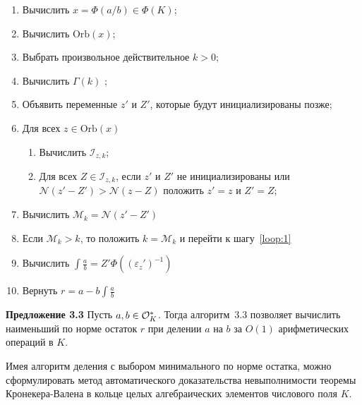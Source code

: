 \documentclass[_00_autoref.tex]{subfiles}
\begin{document}
    \begin{enumerate}
        \item Вычислить $x = \Phi(a/b) \in \Phi(K)$;
        
        \item Вычислить $\textrm{Orb}(x)$;

        \item Выбрать произвольное действительное $k > 0$;

        \item Вычислить $\Gamma(k)$ \label{loop:1};

        \item Объявить переменные $z'$ и $Z'$, которые будут инициализированы позже;

        \item Для всех $z \in \textrm{Orb}(x)$
        \begin{enumerate}
            \item Вычислить $\mathcal{I}_{z, k}$;

            \item Для всех $Z \in \mathcal{I}_{z, k}$, если $z'$ и $Z'$ не инициализированы или $\mathcal{N}(z' - Z') > \mathcal{N}(z - Z)$ положить $z' = z$ и $Z' = Z$;
        \end{enumerate}

        \item Вычислить $\mathcal{M}_k = \mathcal{N}(z' - Z')$
        
        \item Если $\mathcal{M}_k > k$, то положить $k = \mathcal{M}_k$ и перейти к шагу~\ref{loop:1}

        \item Вычислить $\int{\frac{a}{b}} = Z'\Phi((\varepsilon_z')^{-1})$

        \item Вернуть $r = a - b \int{\frac{a}{b}}$
    \end{enumerate}

\textbf{Предложение 3.3}
    Пусть $a, b \in \mathcal{O}_K^{*}$.
    Тогда алгоритм~$3.3$ позволяет вычислить наименьший по норме остаток $r$ при делении $a$ на $b$ за $O(1)$ арифметических операций в $K$.


Имея алгоритм деления с выбором минимального по норме остатка, можно сформулировать метод автоматического доказательства невыполнимости теоремы Кронекера-Валена в кольце целых алгебраических элементов числового поля $K$.
\end{document}
